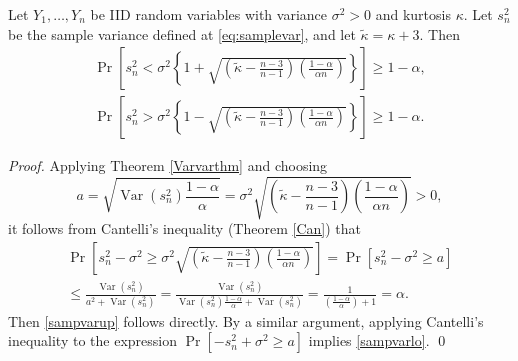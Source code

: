\documentclass[graybox]{svmult}
\newcommand{\Prob}{\Pr}
\DeclareMathOperator{\var}{Var}
\newcommand{\tkappa}{\tilde{\kappa}}
\begin{document}
\begin{lemma}\label{propCant} 
Let $Y_1,\dots,Y_n$ be IID random variables with variance
$\sigma^2>0$ and kurtosis $\kappa$.
Let $s^2_n$ be the sample variance 
defined at \eqref{eq:samplevar}, and let $\tilde\kappa=\kappa+3$.  Then
\begin{subequations} \label{sampvarbd}
\begin{gather}\label{sampvarup}
\Prob\left[s^2_n < \sigma^2 \left\{1 + \sqrt{\left ( \tilde\kappa  - \frac{n-3}{n-1}\right)\left(\frac{1-\alpha}{\alpha n}\right)}\right\} \right] \ge 1 - \alpha, \\
\label{sampvarlo}
\Prob\left[s^2_n > \sigma^2 \left\{1 - \sqrt{\left ( \tilde\kappa  - \frac{n-3}{n-1}\right)\left(\frac{1-\alpha}{\alpha n}\right)}\right\} \right] \ge 1 - \alpha.
\end{gather}
\end{subequations}
\end{lemma}
\begin{proof} Applying Theorem \ref{Varvarthm} and choosing
$$a=\sqrt{\var(s^2_n) \frac{1-\alpha}{\alpha} } = \sigma^2\sqrt{\left(\tkappa-\frac{n-3}{n-1}\right)\left(\frac{1-\alpha}{\alpha n}\right)} >0,
$$
it follows from Cantelli's inequality (Theorem  \ref{Can})  that
\begin{multline*}
\Prob\left[s^2_n-\sigma^2 \geq
\sigma^2\sqrt{\left(\tkappa-\frac{n-3}{n-1}\right)\left(\frac{1-\alpha}{\alpha n}\right)} \right]  = \Prob\left[s^2_n-\sigma^2 \geq
a \right]\\
 \leq \frac{\var(s^2_n)}{a^2+\var(s^2_n)} 
=\frac{\var(s^2_n)}{\var(s^2_n) \frac{1-\alpha}{\alpha}+\var(s^2_n)}  
=\frac{1}{\left(\frac{1-\alpha}{\alpha}\right)+1}=\alpha.
\end{multline*}
Then \eqref{sampvarup} follows directly.  By a similar argument, applying Cantelli's inequality to the expression $\Prob\left[-s^2_n+\sigma^2 \ge a \right]$ implies  \eqref{sampvarlo}. \qed
\end{proof}
\end{document}
